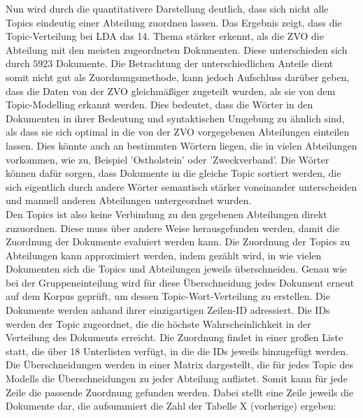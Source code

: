 \documentclass[german,version-2020-11]{uzl-thesis}
\begin{document}
\begin{enumerate}
Nun wird durch die quantitativere Darstellung deutlich, dass sich nicht alle Topics eindeutig einer Abteilung zuordnen lassen. Das Ergebnis zeigt, dass die Topic-Verteilung bei LDA das 14. Thema stärker erkennt, als die ZVO die Abteilung mit den meisten zugeordneten Dokumenten. Diese unterschieden sich durch $5923$ Dokumente. Die Betrachtung der unterschiedlichen Anteile dient somit nicht gut als Zuordnungsmethode, kann jedoch Aufschluss darüber geben, dass die Daten von der ZVO gleichmäßiger zugeteilt wurden, als sie von dem Topic-Modelling erkannt werden. Dies bedeutet, dass die Wörter in den Dokumenten in ihrer Bedeutung und syntaktischen Umgebung zu ähnlich sind, als dass sie sich optimal in die von der ZVO vorgegebenen Abteilungen einteilen lassen. Dies könnte auch an bestimmten Wörtern liegen, die in vielen Abteilungen vorkommen, wie zu, Beispiel 'Ostholstein' oder 'Zweckverband'. Die Wörter können dafür sorgen, dass Dokumente in die gleiche Topic sortiert werden, die sich eigentlich durch andere Wörter semantisch stärker voneinander unterscheiden und manuell anderen Abteilungen untergeordnet wurden.\\ 



Den Topics ist also keine Verbindung zu den gegebenen Abteilungen direkt zuzuordnen. Diese muss über andere Weise herausgefunden werden, damit die Zuordnung der Dokumente evaluiert werden kann. Die Zuordnung der Topics zu Abteilungen kann approximiert werden, indem gezählt wird, in wie vielen Dokumenten sich die Topics und Abteilungen jeweils überschneiden. Genau wie bei der Gruppeneinteilung wird für diese Überschneidung jedes Dokument erneut auf dem Korpus geprüft, um dessen Topic-Wort-Verteilung zu erstellen. Die Dokumente werden anhand ihrer einzigartigen Zeilen-ID adressiert. Die IDs werden der Topic zugeordnet, die die höchste Wahrscheinlichkeit in der Verteilung des Dokuments erreicht. Die Zuordnung findet in einer großen Liste statt, die über 18 Unterlisten verfügt, in die die IDs jeweils hinzugefügt werden. Die Überschneidungen werden in einer Matrix dargestellt, die für jedes Topic des Modells die Überschneidungen zu jeder Abteilung auflistet. Somit kann für jede Zeile die passende Zuordnung gefunden werden. Dabei stellt eine Zeile jeweils die Dokumente dar, die aufsummiert die Zahl der Tabelle X (vorherige) ergeben: 


\end{enumerate}
\end{document}
